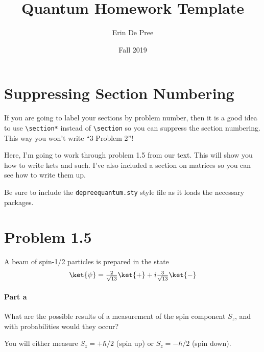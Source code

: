 \documentclass{article}
\title{Quantum Homework Template}
\author{Erin De Pree}
\date{Fall 2019}
\begin{document}
\maketitle

\section*{Suppressing Section Numbering}
    If you are going to label your sections by problem number, then it is a good idea to use \verb+\section*+ instead of \verb+\section+ so you can suppress the section numbering.  This way you won't  write ``3 Problem 2''!
    
    Here, I'm going to work through problem 1.5 from our text.  This will show you how to write kets and such.  I've also included a section on matrices so you can see how to write them up.
    
    Be sure to include the \verb+depreequantum.sty+ style file as it loads the necessary packages.
    
\section*{Problem 1.5}
	A beam of spin-1/2 particles is prepared in the state
	\[	\ket{\psi} = \tfrac{2}{\sqrt{13}} \ket{+} + i \tfrac{3}{\sqrt{13}} \ket{-}	\]
	
	\paragraph{Part a} What are the possible results of a measurement of the spin component $S_z$, and with probabilities would they occur?
	
		You will either measure $S_z = +\hbar/2$ (spin up) or $S_z = - \hbar/2$ (spin down).
		
\end{document}
